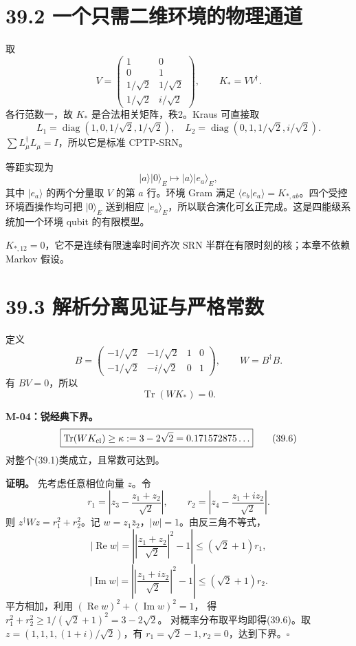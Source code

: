 \documentclass[
  11pt,
  oneside]{book}
\begin{document}
\section{39.2 一个只需二维环境的物理通道}

取 \[
V=\begin{pmatrix}
1&0\\0&1\\1/\sqrt2&1/\sqrt2\\1/\sqrt2&i/\sqrt2
\end{pmatrix},\qquad K_*=VV^\dagger.
\tag{39.2}
\] 各行范数一，故 \(K_*\) 是合法相关矩阵，秩2。Kraus 可直接取 \[
L_1=\operatorname{diag}(1,0,1/\sqrt2,1/\sqrt2),\quad
L_2=\operatorname{diag}(0,1,1/\sqrt2,i/\sqrt2).
\tag{39.3}
\] \(\sum L_\mu^\dagger L_\mu=I\)，所以它是标准 CPTP-SRN。

等距实现为 \[
|a\rangle|0\rangle_E\longmapsto |a\rangle|e_a\rangle_E,
\] 其中 \(|e_a\rangle\) 的两个分量取 \(V\) 的第 \(a\) 行。环境 Gram 满足
\(\langle e_b|e_a\rangle=K_{*,ab}\)。四个受控环境酉操作均可把
\(|0\rangle_E\) 送到相应
\(|e_a\rangle_E\)，所以联合演化可幺正完成。这是四能级系统加一个环境
qubit 的有限模型。

\(K_{*,12}=0\)，它不是连续有限速率时间齐次 SRN
半群在有限时刻的核；本章不依赖 Markov 假设。

\section{39.3 解析分离见证与严格常数}

定义 \[
B=\begin{pmatrix}
-1/\sqrt2&-1/\sqrt2&1&0\\
-1/\sqrt2&-i/\sqrt2&0&1
\end{pmatrix},\qquad W=B^\dagger B.
\tag{39.4}
\] 有 \(BV=0\)，所以 \[
\operatorname{Tr}(WK_*)=0.
\tag{39.5}
\]

\protect\hypertarget{m-04}{}{}

\textbf{M-04：锐经典下界。} \[
\boxed{\operatorname{Tr}(WK_{\rm cl})\ge
\kappa:=3-2\sqrt2=0.171572875\ldots}
\tag{39.6}
\] 对整个(39.1)类成立，且常数可达到。

\textbf{证明。} 先考虑任意相位向量 \(z\)。令 \[
r_1=\left|z_3-\frac{z_1+z_2}{\sqrt2}\right|,\qquad
r_2=\left|z_4-\frac{z_1+iz_2}{\sqrt2}\right|.
\] 则 \(z^\dagger Wz=r_1^2+r_2^2\)。记
\(w=z_1\bar z_2\)，\(|w|=1\)。由反三角不等式， \[
|\operatorname{Re}w|
=\left|\left|\frac{z_1+z_2}{\sqrt2}\right|^2-1\right|
\le(\sqrt2+1)r_1,
\] \[
|\operatorname{Im}w|
=\left|\left|\frac{z_1+iz_2}{\sqrt2}\right|^2-1\right|
\le(\sqrt2+1)r_2.
\] 平方相加，利用 \((\operatorname{Re}w)^2+(\operatorname{Im}w)^2=1\)，
得 \(r_1^2+r_2^2\ge1/(\sqrt2+1)^2=3-2\sqrt2\)。
对概率分布取平均即得(39.6)。取 \(z=(1,1,1,(1+i)/\sqrt2)\)，有
\(r_1=\sqrt2-1,r_2=0\)，达到下界。\(\square\)
\end{document}
